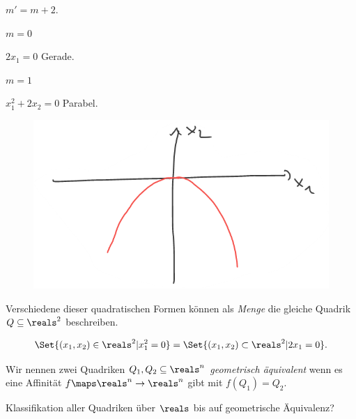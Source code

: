 \begin{eigenschaftenenumerate}
\begin{proofdescription}
\begin{proofdescription}
\begin{figure}[H]
        \label{fig:ellipse_kreis_quadrik }
      \end{figure}
    \end{proofdescription}
    \item \( m'=m+2 \). \begin{proofdescription}
      \item[\( m=0 \)] \begin{proofdescription}
        \item[\( 2x_1=0 \)] \tto Gerade.
      \end{proofdescription}
      \item[\( m=1 \)] \begin{proofdescription}
        \item[\( x_1^2+2x_2=0 \)] \tto Parabel.
        \begin{figure}[H]
          \centering
          \includegraphics[width=0.5\linewidth]{figures/parabel_quadrik}
          \label{fig:parabel_quadrik}
        \end{figure}
      \end{proofdescription}
    \end{proofdescription}
  \end{proofdescription}
\end{eigenschaftenenumerate}
\begin{bemerkung*}
  Verschiedene dieser quadratischen Formen können als \emph{Menge} die gleiche Quadrik \( Q\subseteq \reals^2 \) beschreiben.
\end{bemerkung*}
\begin{beispiel*}
  \begin{equation*}
    \Set{(x_1,x_2)\in \reals^2|x_1^2=0}=\Set{(x_1,x_2)\subset \reals^2| 2x_1=0}.
  \end{equation*}
\end{beispiel*}
\begin{definition*}
  Wir nennen zwei Quadriken \( Q_1,Q_2\subseteq \reals^n \) \emph{geometrisch äquivalent} wenn es eine Affinität \( f\maps \reals^n\to \reals^n \) gibt mit \( f(Q_1)=Q_2 \).
\end{definition*}
\begin{frage*}
  Klassifikation aller Quadriken über \( \reals \) bis auf geometrische Äquivalenz?
\end{frage*}
